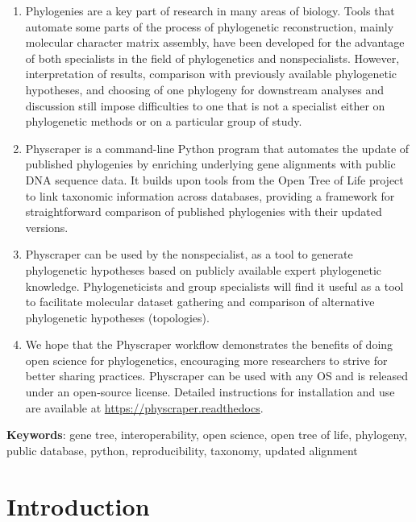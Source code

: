 \documentclass[]{article}
\begin{document}
\begin{enumerate}
\def\labelenumi{\arabic{enumi}.}
\item
  Phylogenies are a key part of research in many areas of biology. Tools that automate
  some parts of the process of phylogenetic reconstruction, mainly molecular character matrix assembly,
  have been developed for the advantage of both specialists in the field of phylogenetics and nonspecialists.
  However, interpretation of results, comparison with previously available phylogenetic
  hypotheses, and choosing of one phylogeny for downstream analyses and discussion still impose difficulties
  to one that is not a specialist either on phylogenetic methods or on a particular group of study.
\item
  Physcraper is a command-line Python program that automates the update of published
  phylogenies by enriching underlying gene alignments with public DNA sequence data. It builds upon tools from the Open Tree of Life project to link taxonomic information across databases, providing a framework for straightforward comparison of published phylogenies with their updated versions.
\item
  Physcraper can be used by the nonspecialist, as a tool to generate phylogenetic
  hypotheses based on publicly available expert phylogenetic knowledge.
  Phylogeneticists and group specialists will find it useful as a tool to facilitate molecular dataset gathering and comparison
  of alternative phylogenetic hypotheses (topologies).
\item
  We hope that the Physcraper workflow demonstrates the benefits of doing open science for phylogenetics, encouraging more researchers to strive for better sharing practices. Physcraper can be used with any OS and is released under an open-source license. Detailed instructions for installation and
  use are available at \href{https://physcraper.readthedocs.io/en/tutorial/index.html}{https://physcraper.readthedocs}.
\end{enumerate}

\textbf{Keywords}: gene tree, interoperability, open science, open tree of life, phylogeny, public database, python, reproducibility, taxonomy, updated alignment

\newpage

\hypertarget{introduction}{%
\section{Introduction}\label{introduction}}
\end{document}
